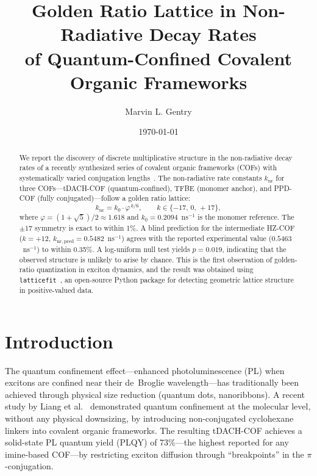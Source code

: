 ﻿\documentclass[11pt,a4paper]{article}
\begin{document}
\title{Golden Ratio Lattice in Non-Radiative Decay Rates\\
       of Quantum-Confined Covalent Organic Frameworks}

\author{Marvin L. Gentry}
\date{\today}

\maketitle

\begin{abstract}
We report the discovery of discrete multiplicative structure in the
non-radiative decay rates of a recently synthesized series of covalent
organic frameworks (COFs) with systematically varied conjugation
lengths~\cite{Liang2025}. The non-radiative rate constants
$k_{\mathrm{nr}}$ for three COFs---tDACH-COF (quantum-confined),
TFBE (monomer anchor), and PPD-COF (fully conjugated)---follow a
golden ratio lattice:
\[
k_{\mathrm{nr}} = k_0 \cdot \varphi^{\,k/6}, \qquad k \in \{-17,\, 0,\, +17\},
\]
where $\varphi = (1+\sqrt{5})/2 \approx 1.618$ and
$k_0 = 0.2094$~ns$^{-1}$ is the monomer reference.
The $\pm 17$ symmetry is exact to within 1\%.
A blind prediction for the intermediate HZ-COF ($k = +12$,
$k_{\mathrm{nr,pred}} = 0.5482$~ns$^{-1}$) agrees with the reported
experimental value ($0.5463$~ns$^{-1}$) to within 0.35\%.
A log-uniform null test yields $p = 0.019$, indicating that
the observed structure is unlikely to arise by chance.
This is the first observation of golden-ratio quantization in
exciton dynamics, and the result was obtained using
\texttt{latticefit}~\cite{Gentry:LatticeFit}, an open-source
Python package for detecting geometric lattice structure in
positive-valued data.
\end{abstract}

\section{Introduction}

The quantum confinement effect---enhanced photoluminescence (PL)
when excitons are confined near their de~Broglie wavelength---has
traditionally been achieved through physical size reduction (quantum
dots, nanoribbons). A recent study by Liang et al.~\cite{Liang2025}
demonstrated quantum confinement at the molecular level, without any
physical downsizing, by introducing non-conjugated cyclohexane linkers
into covalent organic frameworks. The resulting tDACH-COF achieves
a solid-state PL quantum yield (PLQY) of 73\%---the highest reported
for any imine-based COF---by restricting exciton diffusion through
``breakpoints'' in the $\pi$-conjugation.
\end{document}
